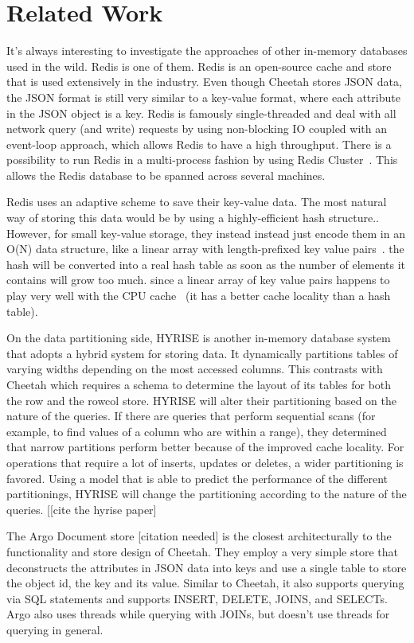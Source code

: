 \documentclass[11pt,journal,compsoc]{IEEEtran}
\begin{document}
\section{Related Work}
It’s always interesting to investigate the approaches of other in-memory databases used in the wild. Redis is one of them. Redis is an open-source cache and store that is used extensively in the industry. Even though Cheetah stores JSON data, the JSON format is still very similar to a key-value format, where each attribute in the JSON object is a key. Redis is famously single-threaded and deal with all network query (and write) requests by using non-blocking IO coupled with an event-loop approach, which allows Redis to have a high throughput. There is a possibility to run Redis in a multi-process fashion by using Redis Cluster~\cite{redis-cluster}. This allows the Redis database to be spanned across several machines.

Redis uses an adaptive scheme to save their key-value data. The most natural way of storing this data would be by using a highly-efficient hash structure.. However, for small key-value storage, they instead instead just encode them in an O(N) data structure, like a linear array with length-prefixed key value pairs~\cite{redis}. the hash will be converted into a real hash table as soon as the number of elements it contains will grow too much. since a linear array of key value pairs happens to play very well with the CPU cache~\cite{redis} (it has a better cache locality than a hash table).

On the data partitioning side, HYRISE is another in-memory database system that adopts a hybrid system for storing data. It dynamically partitions tables of varying widths depending on the most accessed columns. This contrasts with Cheetah which requires a schema to determine the layout of its tables for both the row and the rowcol store. HYRISE will alter their partitioning based on the nature of the queries. If there are queries that perform sequential scans (for example, to find values of a column who are within a range), they determined that narrow partitions perform better because of the improved cache locality. For operations that require a lot of inserts, updates or deletes, a wider partitioning is favored. Using a model that is able to predict the performance of the different partitionings, HYRISE will change the partitioning according to the nature of the queries. 
[[cite the hyrise paper]

The Argo Document store [citation needed] is the closest architecturally to the functionality and store design of Cheetah. They employ a very simple store that deconstructs the attributes in JSON data into keys and use a single table to store the object id, the key and its value. Similar to Cheetah, it also supports querying via SQL statements and supports INSERT, DELETE, JOINS, and SELECTs. Argo also uses threads while querying with JOINs, but doesn’t use threads for querying in general.
\end{document}
